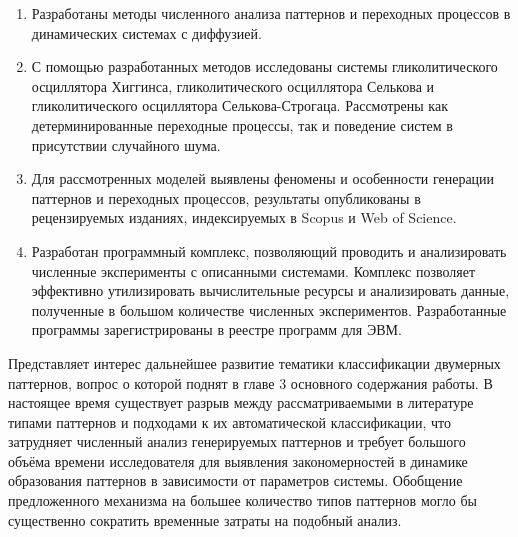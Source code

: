 \begin{enumerate}
  \item Разработаны методы численного анализа паттернов и переходных процессов в динамических системах с диффузией. 
  \item С помощью разработанных методов исследованы системы гликолитического осциллятора Хиггинса, гликолитического осциллятора Селькова и гликолитического осциллятора Селькова-Строгаца. Рассмотрены как детерминированные переходные процессы, так и поведение систем в присутствии случайного шума.
  \item Для рассмотренных моделей выявлены феномены и особенности генерации паттернов и переходных процессов, результаты опубликованы в рецензируемых изданиях, индексируемых в Scopus и Web of Science.
  \item Разработан программный комплекс, позволяющий проводить и анализировать численные эксперименты с описанными системами. Комплекс позволяет эффективно утилизировать вычислительные ресурсы и анализировать данные, полученные в большом количестве численных экспериментов. Разработанные программы зарегистрированы в реестре программ для ЭВМ.
\end{enumerate}

Представляет интерес дальнейшее развитие тематики классификации двумерных паттернов, вопрос о которой поднят в главе 3 основного содержания работы. В настоящее время существует разрыв между рассматриваемыми в литературе типами паттернов и подходами к их автоматической классификации, что затрудняет численный анализ генерируемых паттернов и требует большого объёма времени исследователя для выявления закономерностей в динамике образования паттернов в зависимости от параметров системы. Обобщение предложенного механизма на большее количество типов паттернов могло бы существенно сократить временные затраты на подобный анализ.
